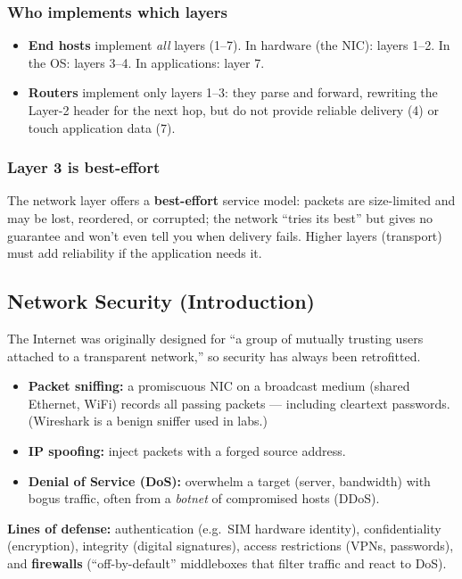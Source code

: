\documentclass[hidelinks]{article}
\begin{document}
\subsubsection{Who implements which layers}
\begin{itemize}
    \item \textbf{End hosts} implement \emph{all} layers (1--7). In hardware
    (the NIC): layers 1--2. In the OS: layers 3--4. In applications: layer 7.
    \item \textbf{Routers} implement only layers 1--3: they parse and forward,
    rewriting the Layer-2 header for the next hop, but do not provide reliable
    delivery (4) or touch application data (7).
\end{itemize}

\subsubsection{Layer 3 is best-effort}
The network layer offers a \textbf{best-effort} service model: packets are
size-limited and may be lost, reordered, or corrupted; the network ``tries its
best'' but gives no guarantee and won't even tell you when delivery fails.
Higher layers (transport) must add reliability if the application needs it.

\subsection{Network Security (Introduction)}

The Internet was originally designed for ``a group of mutually trusting users
attached to a transparent network,'' so security has always been retrofitted.

\begin{itemize}
    \item \textbf{Packet sniffing:} a promiscuous NIC on a broadcast medium
    (shared Ethernet, WiFi) records all passing packets --- including
    cleartext passwords. (Wireshark is a benign sniffer used in labs.)
    \item \textbf{IP spoofing:} inject packets with a forged source address.
    \item \textbf{Denial of Service (DoS):} overwhelm a target (server,
    bandwidth) with bogus traffic, often from a \emph{botnet} of compromised
    hosts (DDoS).
\end{itemize}

\noindent\textbf{Lines of defense:} authentication (e.g.\ SIM hardware
identity), confidentiality (encryption), integrity (digital signatures),
access restrictions (VPNs, passwords), and \textbf{firewalls}
(``off-by-default'' middleboxes that filter traffic and react to DoS).
\end{document}
